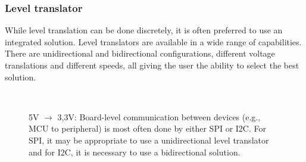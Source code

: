                    
      \subsubsection{Level translator} %
        While level translation can be done discretely, it is often preferred to use an integrated
        solution. Level translators are available in a wide range of capabilities. There are
        unidirectional and bidirectional configurations, different voltage translations and
        different speeds, all giving the user the ability to select the best solution. 
        \begin{figure}[ht!]
          \centering
              {}      \\
              {}
          \caption{5V $\rightarrow$ 3,3V: Board-level communication between devices (e.g., MCU to
                   peripheral) is most often done by either SPI or I2C. For SPI, it may be
                   appropriate to use a unidirectional level translator and for I2C, it is necessary
                   to use a bidirectional solution.}
          \label{CES:fig_level_translator}
        \end{figure}           
      
